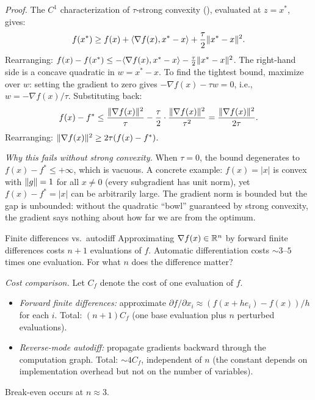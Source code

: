 \solution
\textit{Proof.}
The $C^1$ characterization of $\tau$-strong convexity (), evaluated at $z = x^*$, gives:
\begin{equation}\label{eq:ex-strong-gap-start}
	f(x^*) \geq f(x) + \langle\nabla f(x), x^* - x\rangle + \frac{\tau}{2}\lVert x^* - x\rVert^2.
\end{equation}
Rearranging: $f(x) - f(x^*) \leq -\langle\nabla f(x), x^* - x\rangle - \frac{\tau}{2}\lVert x^* - x\rVert^2$.
The right-hand side is a concave quadratic in $w = x^* - x$.
To find the tightest bound, maximize over $w$: setting the gradient to zero gives $-\nabla f(x) - \tau w = 0$, i.e., $w = -\nabla f(x)/\tau$.
Substituting back:
\begin{equation}\label{eq:ex-strong-gap-result}
	f(x) - f^* \leq \frac{\lVert\nabla f(x)\rVert^2}{\tau} - \frac{\tau}{2} \cdot \frac{\lVert\nabla f(x)\rVert^2}{\tau^2} = \frac{\lVert\nabla f(x)\rVert^2}{2\tau}.
\end{equation}
Rearranging: $\lVert\nabla f(x)\rVert^2 \geq 2\tau(f(x) - f^*)$.

\textit{Why this fails without strong convexity.}
When $\tau = 0$, the bound degenerates to $f(x) - f^* \leq +\infty$, which is vacuous.
A concrete example: $f(x) = |x|$ is convex with $\lVert g\rVert = 1$ for all $x \neq 0$ (every subgradient has unit norm), yet $f(x) - f^* = |x|$ can be arbitrarily large.
The gradient norm is bounded but the gap is unbounded: without the quadratic ``bowl'' guaranteed by strong convexity, the gradient says nothing about how far we are from the optimum.

\begin{exercise}{Finite differences vs.\ autodiff}\label{ex:finite-diff-cost}
	Approximating $\nabla f(x) \in \mathbb{R}^n$ by forward finite differences costs $n + 1$ evaluations of $f$.
	Automatic differentiation costs $\sim 3$--$5$ times one evaluation.
	For what $n$ does the difference matter?
\end{exercise}

\solution
\textit{Cost comparison.}
Let $C_f$ denote the cost of one evaluation of $f$.
\begin{itemize}
	\item \textit{Forward finite differences:} approximate $\partial f / \partial x_i \approx (f(x + h e_i) - f(x)) / h$ for each $i$. Total: $(n + 1) C_f$ (one base evaluation plus $n$ perturbed evaluations).
	\item \textit{Reverse-mode autodiff:} propagate gradients backward through the computation graph. Total: $\sim 4 C_f$, independent of $n$ (the constant depends on implementation overhead but not on the number of variables).
\end{itemize}
Break-even occurs at $n \approx 3$.

